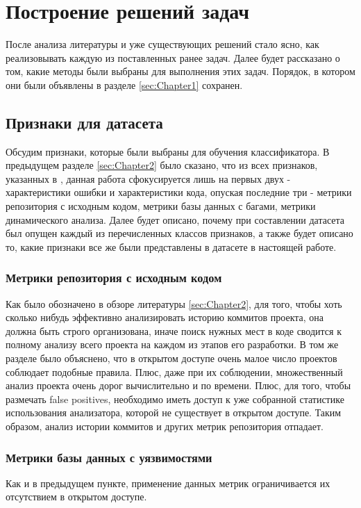 \section{Построение решений задач}
\label{sec:Chapter3} 

После анализа литературы и уже существующих решений стало ясно, как реализовывать каждую из поставленных ранее задач. Далее будет рассказано о том, какие методы были выбраны для выполнения этих задач. Порядок, в котором они были объявлены в разделе \ref{sec:Chapter1} сохранен.

\subsection{Признаки для датасета}
\label{sec:dataset} 

Обсудим признаки, которые были выбраны для обучения классификатора. В предыдущем разделе \ref{sec:Chapter2} было сказано, что из всех признаков, указанных в \cite{HECKMAN2011363}, данная работа сфокусируется лишь на первых двух - характеристики ошибки и характеристики кода, опуская последние три - метрики репозитория с исходным кодом, метрики базы данных с багами, метрики динамического анализа. Далее будет описано, почему при составлении датасета был опущен каждый из перечисленных классов признаков, а также будет описано то, какие признаки все же были представлены в датасете в настоящей работе.

\subsubsection{Метрики репозитория с исходным кодом}
Как было обозначено в обзоре литературы \ref{sec:Chapter2}, для того, чтобы хоть сколько нибудь эффективно анализировать историю коммитов проекта, она должна быть строго организована, иначе поиск нужных мест в коде сводится к полному анализу всего проекта на каждом из этапов его разработки. В том же разделе было объяснено, что в открытом доступе очень малое число проектов соблюдает подобные правила. Плюс, даже при их соблюдении, множественный анализ проекта очень дорог вычислительно и по времени. Плюс, для того, чтобы размечать false positives, необходимо иметь доступ к уже собранной статистике использования анализатора, которой не существует в открытом доступе. Таким образом, анализ истории коммитов и других метрик репозитория отпадает.

\subsubsection{Метрики базы данных с уязвимостями}
Как и в предыдущем пункте, применение данных метрик ограничивается их отсутствием в открытом доступе.

